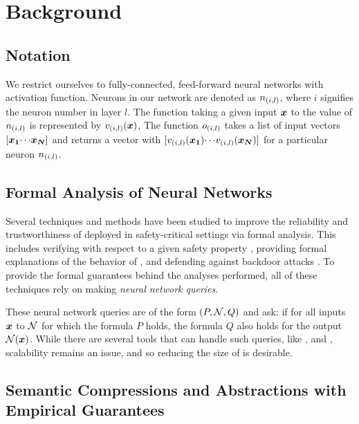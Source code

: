 \section{Background}
\subsection{Notation}

We restrict ourselves to fully-connected, feed-forward neural networks with
\relu activation function. 
Neurons in our network are denoted as $n_{(i,l)}$, where $i$ signifies the 
neuron number in layer $l$.  %
The function taking a given input $\boldsymbol{x}$ to the value of $n_{(i,l)}$ is
represented by $v_{(i,l)}(\boldsymbol{x})$, %
The function $o_{(i,l)}$ takes a list of input vectors
$[\boldsymbol{x_1} {\cdots} \boldsymbol{x_N}]$ and returns a vector with
$[v_{(i,l)}(\boldsymbol{x_1}) {\cdots} v_{(i,l)}(\boldsymbol{x_N})]$ for a particular
neuron $n_{(i,l)}$.  %

\subsection{Formal Analysis of Neural Networks }
\label{s:form-an}

Several techniques and methods have been studied to improve the reliability and
trustworthiness of \dnn deployed in safety-critical settings via formal
analysis. This includes verifying \dnn with respect to a given
safety property
\cite{reluplex,cegar-nn,deeppoly,cegarette,cleverest-nn,conv-abs-gk,deep-abstract,lin-comb-abs-jan},
providing formal explanations of
the behavior of \dnn \cite{minimal-image-fxai,overview-fxai}, and defending
against backdoor attacks \cite{backdoor-verification}.
 To provide the formal guarantees behind the
analyses performed, all of these techniques rely on making \textit{neural
network queries}. 

These neural network queries are of the form $(P, \mathcal{N}, Q)$ and ask: if
for all inputs $\boldsymbol{x}$ to $\mathcal{N}$ for which the formula $P$ holds, 
the formula $Q$ also holds for the output $\mathcal{N}(\boldsymbol{x})$. While there are
several
tools that can handle such queries, like \marabou, \abcrown and \neuralsat,
scalability remains an issue, and so reducing the size of \cnc is desirable.

\subsection{Semantic Compressions and Abstractions with Empirical Guarantees}
\label{s:emp-abs}

